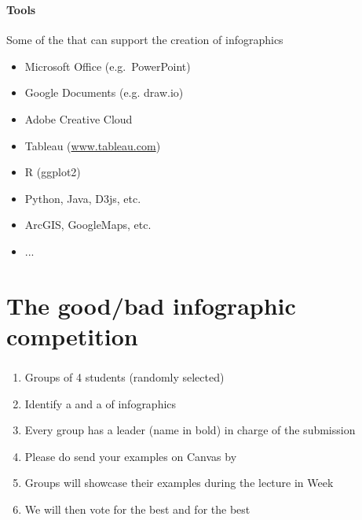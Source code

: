 \documentclass[8pt]{beamer}
\begin{document}
\begin{frame}
\frametitle{\insertsection}
\framesubtitle{Tools}

Some of the {\color{blue}{tools}} that can support the creation of infographics
\begin{itemize}
\item Microsoft Office (e.g.\ PowerPoint)
\item Google Documents (e.g. draw.io)
\item Adobe Creative Cloud 
\item Tableau (\url{www.tableau.com})
\item R (ggplot2)
\item Python, Java, D3js, etc.
\item ArcGIS, GoogleMaps, etc.
\item ...
\end{itemize}

\end{frame}





  
\section{The good/bad infographic competition}
\bgroup
{}
\begin{frame}[plain]{}
\begin{center}
\color{white}{\Huge\insertsection}
\end{center}
\end{frame}
\egroup


\begin{frame}
\frametitle{\insertsection}

\begin{enumerate}
\item Groups of 4 students (randomly selected)
\item Identify a {\color{dkgreen}{good example}} and a {\color{red}{bad example}}  of infographics 
\item Every group has a leader (name in bold) in charge of the submission
\item Please do send your examples on Canvas by {\color{orange}{21 March 2022}}
\item Groups will showcase their examples during the lecture in Week
\item We will then vote for the best {\color{dkgreen}{`good infographic'}} and for the best {\color{red}{`bad infographic'}}
\end{enumerate}


\end{frame}
\end{document}

